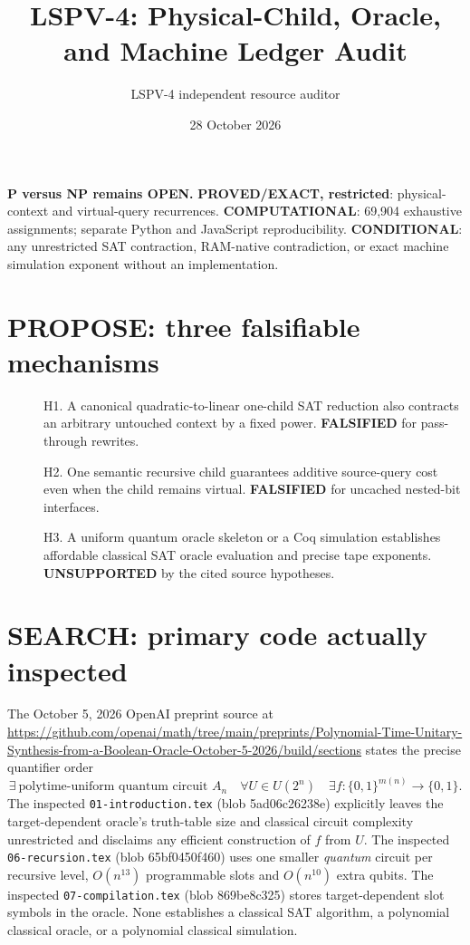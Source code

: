 \documentclass[11pt]{article}
\title{LSPV-4: Physical-Child, Oracle, and Machine Ledger Audit}
\author{LSPV-4 independent resource auditor}
\date{28 October 2026}
\begin{document}
\maketitle
\noindent\textbf{P versus NP remains OPEN.}
\textbf{PROVED/EXACT, restricted}: physical-context and virtual-query recurrences.
\textbf{COMPUTATIONAL}: 69,904 exhaustive assignments; separate Python and JavaScript reproducibility.
\textbf{CONDITIONAL}: any unrestricted SAT contraction, RAM-native contradiction, or exact machine simulation exponent without an implementation.

\section{PROPOSE: three falsifiable mechanisms}
\begin{description}
\item[] H1. A canonical quadratic-to-linear one-child SAT reduction also contracts an arbitrary untouched context by a fixed power. \textbf{FALSIFIED} for pass-through rewrites.
\item[] H2. One semantic recursive child guarantees additive source-query cost even when the child remains virtual. \textbf{FALSIFIED} for uncached nested-bit interfaces.
\item[] H3. A uniform quantum oracle skeleton or a Coq simulation establishes affordable classical SAT oracle evaluation and precise tape exponents. \textbf{UNSUPPORTED} by the cited source hypotheses.
\end{description}

\section{SEARCH: primary code actually inspected}
The October 5, 2026 OpenAI preprint source at
\url{https://github.com/openai/math/tree/main/preprints/Polynomial-Time-Unitary-Synthesis-from-a-Boolean-Oracle-October-5-2026/build/sections}
states the precise quantifier order
\[
\exists\ \text{polytime-uniform quantum circuit }A_n\quad
\forall U\in U(2^n)\quad \exists f:\{0,1\}^{m(n)}\to\{0,1\}.
\]
The inspected \texttt{01-introduction.tex} (blob 5ad06c26238e) explicitly leaves the target-dependent oracle's truth-table size and classical circuit complexity unrestricted and disclaims any efficient construction of $f$ from $U$. The inspected \texttt{06-recursion.tex} (blob 65bf0450f460) uses one smaller \emph{quantum} circuit per recursive level, $O(n^{13})$ programmable slots and $O(n^{10})$ extra qubits. The inspected \texttt{07-compilation.tex} (blob 869be8c325) stores target-dependent slot symbols in the oracle. None establishes a classical SAT algorithm, a polynomial classical oracle, or a polynomial classical simulation.
\end{document}

